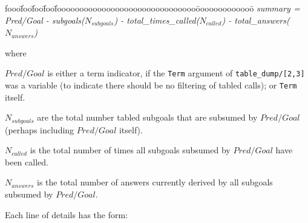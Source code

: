 \begin{description}
\begin{tabbing}
fooo\=foo\=foo\=foo\=fooooooooooooooooooooooooooooooo\=ooooooooooooo\=\kill
%
{\em   summary = } \\
\> {\em Pred/Goal  - subgoals($N_{subgoals}$) - total\_times\_called($N_{called}$) - total\_answers($N_{answers}$)}
%
\end{tabbing}
where 
\bi
\item $Pred/Goal$ is either a term indicator, if the {\tt Term}
  argument of {\tt table\_dump/[2,3]} was a variable (to indicate there
  should be no filtering of tabled calls); or {\tt Term} itself.
%
\item $N_{subgoals}$ are the total number tabled subgoals that are
  subsumed by $Pred/Goal$ (perhaps including $Pred/Goal$ itself).
%
\item $N_{called}$ is the total number of times all subgoals subsumed
  by $Pred/Goal$ have been called.
%
\item $N_{answers}$ is the total number of answers currently derived
  by all subgoals subsumed by $Pred/Goal$.
\ei

Each line of details has the form:


\end{description}
